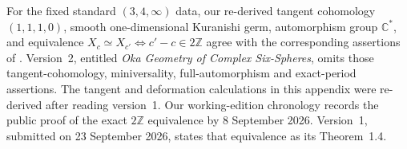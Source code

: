 \begin{remark}\hypertarget{tag-02YS}{}\label{night:P5.7}
For the fixed standard $(3,4,\infty)$ data, our re-derived tangent
cohomology $(1,1,1,0)$, smooth one-dimensional Kuranishi germ,
automorphism group $\mathbb C^*$, and equivalence
$X_c\simeq X_{c'}\Longleftrightarrow c'-c\in2\mathbb Z$
agree with the corresponding assertions of
\cite{DuEtAl2026v1}. Version~2, entitled
\emph{Oka Geometry of Complex Six-Spheres}, omits those
tangent-cohomology, miniversality, full-automorphism and exact-period
assertions. The tangent and deformation calculations in this appendix
were re-derived after reading version~1. Our working-edition chronology records the public proof of the exact
$2\mathbb Z$ equivalence by 8 September 2026. Version~1, submitted on
23 September 2026, states that equivalence as its Theorem~1.4.
\end{remark}
